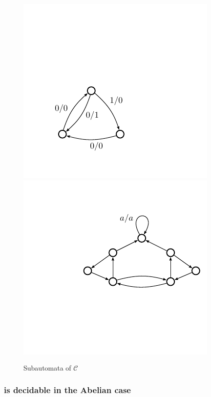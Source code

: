 \documentclass[11pt]{article}
\begin{document}
\begin{figure}
\begin{center}
\includegraphics[scale=0.5]{figures/a32}
\includegraphics[scale=0.5]{figures/bowtie}
\end{center}
\caption{Subautomata of $\mathcal{C}$}
\end{figure}

\subsubsection{ is decidable in the Abelian case}


\end{document}
